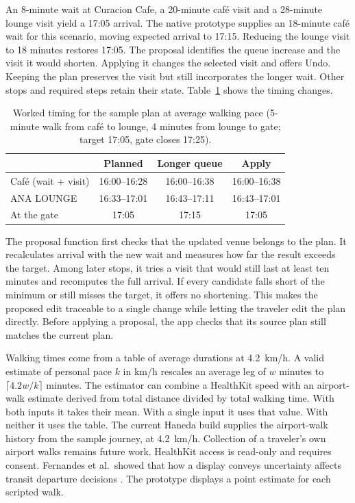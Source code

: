 \documentclass[sigconf,nonacm,balance=false]{acmart}
\begin{document}
An 8-minute wait at Curacion Cafe, a 20-minute caf\'e visit and a 28-minute lounge visit yield a 17:05 arrival. The native prototype supplies an 18-minute caf\'e wait for this scenario, moving expected arrival to 17:15. Reducing the lounge visit to 18 minutes restores 17:05. The proposal identifies the queue increase and the visit it would shorten. Applying it changes the selected visit and offers Undo. Keeping the plan preserves the visit but still incorporates the longer wait. Other stops and required steps retain their state. Table~\ref{tab:worked} shows the timing changes.

\begin{table}[t]\small\centering
\begin{tabular}{@{}lccc@{}}\toprule
 & Planned & Longer queue & Apply \\\midrule
Café (wait + visit) & 16:00--16:28 & 16:00--16:38 & 16:00--16:38\\
ANA LOUNGE & 16:33--17:01 & 16:43--17:11 & 16:43--17:01\\
At the gate & 17:05 & 17:15 & 17:05\\\bottomrule
\end{tabular}
\caption{Worked timing for the sample plan at average walking pace (5-minute walk from café to lounge, 4 minutes from lounge to gate; target 17:05, gate closes 17:25).}\label{tab:worked}
\end{table}

The proposal function first checks that the updated venue belongs to the plan. It recalculates arrival with the new wait and measures how far the result exceeds the target. Among later stops, it tries a visit that would still last at least ten minutes and recomputes the full arrival. If every candidate falls short of the minimum or still misses the target, it offers no shortening. This makes the proposed edit traceable to a single change while letting the traveler edit the plan directly. Before applying a proposal, the app checks that its source plan still matches the current plan.

Walking times come from a table of average durations at 4.2~km/h. A valid estimate of personal pace \(k\) in km/h rescales an average leg of \(w\) minutes to \(\lceil 4.2w/k \rceil\) minutes. The estimator can combine a HealthKit speed with an airport-walk estimate derived from total distance divided by total walking time. With both inputs it takes their mean. With a single input it uses that value. With neither it uses the table. The current Haneda build supplies the airport-walk history from the sample journey, at 4.2~km/h. Collection of a traveler's own airport walks remains future work. HealthKit access is read-only and requires consent. Fernandes et al.\ showed that how a display conveys uncertainty affects transit departure decisions \cite{ref8}. The prototype displays a point estimate for each scripted walk.
\end{document}
